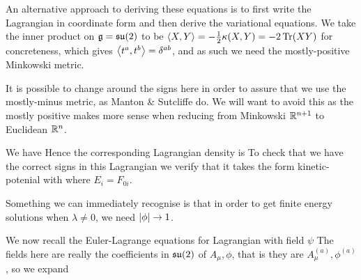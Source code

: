 \documentclass{article}
\begin{document}
An alternative approach to deriving these equations is to first write the Lagrangian in coordinate form and then derive the variational equations. We take the inner product on $\mathfrak{g} = \mathfrak{su}(2)$ to be $\left\langle X,Y \right\rangle = -\frac{1}{2}\kappa(X,Y) = -2\operatorname{Tr}(XY)$ for concreteness, which gives $\left\langle t^a,t^b \right\rangle = \delta^{ab}$, and as such we need the mostly-positive Minkowski metric. 
\begin{remark}
	It is possible to change around the signs here in order to assure that we use the mostly-minus metric, as Manton \& Sutcliffe do. We will want to avoid this as the mostly positive makes more sense when reducing from Minkowski $\mathbb{R}^{n+1}$ to Euclidean $\mathbb{R}^n$. 
\end{remark}
We have 
Hence the corresponding Lagrangian density is 
To check that we have the correct signs in this Lagrangian we verify that it takes the form kinetic-potenial with 
where $E_i = F_{0i}$.
\begin{remark}
	Something we can immediately recognise is that in order to get finite energy solutions when $\lambda \neq 0$, we need $\left\lvert \phi \right\rvert \to 1$.
\end{remark}
We now recall the Euler-Lagrange equations for Lagrangian with field $\psi$
The fields here are really the coefficients in $\mathfrak{su}(2)$ of $A_\mu, \phi$, that is they are $A_\mu^{(a)}, \phi^{(a)}$, so we expand   
\end{document}
